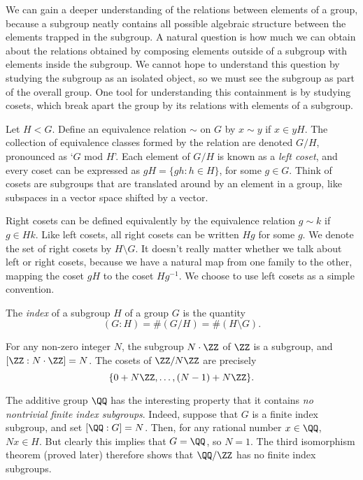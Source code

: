 We can gain a deeper understanding of the relations between elements of a group, because a subgroup neatly contains all possible algebraic structure between the elements trapped in the subgroup. A natural question is how much we can obtain about the relations obtained by composing elements outside of a subgroup with elements inside the subgroup. We cannot hope to understand this question by studying the subgroup as an isolated object, so we must see the subgroup as part of the overall group. One tool for understanding this containment is by studying cosets, which break apart the group by its relations with elements of a subgroup.

Let $H < G$. Define an equivalence relation $\sim$ on $G$ by $x \sim y$ if $x \in yH$. The collection of equivalence classes formed by the relation are denoted $G/H$, pronounced as `$G$ mod $H$'. Each element of $G/H$ is known as a \emph{left coset}, and every coset can be expressed as $gH = \{ gh : h \in H \}$, for some $g \in G$. Think of cosets are subgroups that are translated around by an element in a group, like subspaces in a vector space shifted by a vector.

\begin{remark}
    Right cosets can be defined equivalently by the equivalence relation $g \sim k$ if $g \in Hk$. Like left cosets, all right cosets can be written $Hg$ for some $g$. We denote the set of right cosets by $H \setminus G$. It doesn't really matter whether we talk about left or right cosets, because we have a natural map from one family to the other, mapping the coset $gH$ to the coset $Hg^{-1}$. We choose to use left cosets as a simple convention.
\end{remark}

The \emph{index} of a subgroup $H$ of a group $G$ is the quantity
%
\[ (G:H) = \#(G/H) = \#(H \setminus G). \]

\begin{example}
    For any non-zero integer $N$, the subgroup $N \cdot \ZZ$ of $\ZZ$ is a subgroup, and $[\ZZ: N \cdot \ZZ] = N$. The cosets of $\ZZ/N \ZZ$ are precisely
    \[ \{ 0 + N \ZZ, \dots, (N-1) + N \ZZ \}. \]
\end{example}

\begin{example}
    The additive group $\QQ$ has the interesting property that it contains \emph{no nontrivial finite index subgroups}. Indeed, suppose that $G$ is a finite index subgroup, and set $[\QQ:G] = N$. Then, for any rational number $x \in \QQ$, $Nx \in H$. But clearly this implies that $G = \QQ$, so $N = 1$. The third isomorphism theorem (proved later) therefore shows that $\QQ/\ZZ$ has no finite index subgroups.
\end{example}

